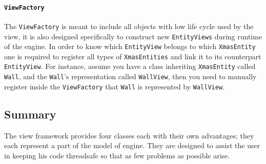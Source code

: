 \paragraph*{\texttt{ViewFactory}}

The \texttt{ViewFactory} is meant to include all objects with low
life cycle used by the view, it is also designed specifically to construct
new \texttt{EntityViews} during runtime of the engine. In order to
know which \texttt{EntityView} belongs to which \texttt{XmasEntity}
one is required to register all types of \texttt{XmasEntities} and
link it to its counterpart \texttt{EntityView}. For instance, assume
you have a class inheriting \texttt{XmasEntity} called \texttt{Wall},
and the \texttt{Wall}\textquoteright{}s representation called \texttt{WallView},
then you need to manually register inside the \texttt{ViewFactory}
that \texttt{Wall} is represented by \texttt{WallView}. 


\subsection*{Summary}

The view framework provides four classes each with their own advantages;
they each represent a part of the model of engine. They are designed
to assist the user in keeping his code threadsafe so that as few problems
as possible arise.
